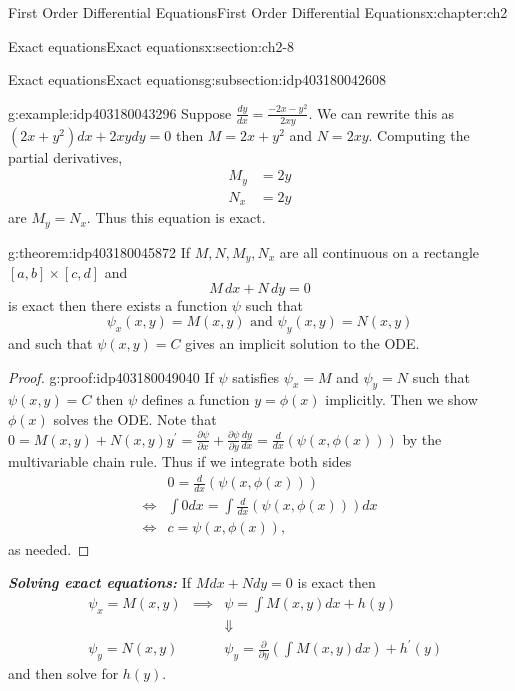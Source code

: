 \documentclass[oneside,10pt,]{book}
\newcommand{\alert}[1]{\textbf{\textit{#1}}}
\numberwithin{equation}{section}
\numberwithin{equation}{section}
\newcommand{\amp}{&}
\begin{document}
\begin{chapterptx}{First Order Differential Equations}{}{First Order Differential Equations}{}{}{x:chapter:ch2}
\begin{sectionptx}{Exact equations}{}{Exact equations}{}{}{x:section:ch2-8}
\begin{subsectionptx}{Exact equations}{}{Exact equations}{}{}{g:subsection:idp403180042608}
\begin{example}{}{g:example:idp403180043296}%
Suppose \(\frac{dy}{dx}=\frac{-2x-y^{2}}{2xy}.\) We can rewrite this as \(\left(2x+y^{2}\right)dx+2xydy=0\) then \(M=2x+y^{2}\) and \(N=2xy\). Computing the partial derivatives,%
\begin{align*}
M_{y} \amp =2y\\
N_{x} \amp =2y
\end{align*}
are \(M_{y}=N_{x}\). Thus this equation is exact.\end{example}
\begin{theorem}{}{}{g:theorem:idp403180045872}%
If \(M,N,M_{y},N_{x}\) are all continuous on a rectangle \([a,b]\times[c,d]\) and%
\begin{equation*}
M\,dx+N\,dy=0
\end{equation*}
is exact then there exists a function \(\psi\) such that%
\begin{equation*}
\psi_{x}(x,y)=M(x,y)\text{ and }\psi_{y}(x,y)=N(x,y)
\end{equation*}
and such that \(\psi(x,y)=C\) gives an implicit solution to the ODE.%
\end{theorem}
\begin{proof}{}{g:proof:idp403180049040}
If \(\psi\) satisfies \(\psi_{x}=M\) and \(\psi_{y}=N\) such that \(\psi(x,y)=C\) then \(\psi\) defines a function \(y=\phi(x)\) implicitly. Then we show \(\phi(x)\) solves the ODE. Note that \(0=M(x,y)+N(x,y)y^{\prime}=\frac{\partial\psi}{\partial x}+\frac{\partial\psi}{\partial y}\frac{dy}{dx}=\frac{d}{dx}\left(\psi\left(x,\phi(x)\right)\right)\) by the multivariable chain rule. Thus if we integrate both sides%
\begin{align*}
\amp 0 =\frac{d}{dx}\left(\psi\left(x,\phi(x)\right)\right) \\
\iff\amp \int0dx=\int\frac{d}{dx}\left(\psi\left(x,\phi(x)\right)\right)dx\\
\iff \amp c=\psi\left(x,\phi(x)\right),
\end{align*}
as needed.\end{proof}
\alert{Solving exact equations:} If \(Mdx+Ndy=0\) is exact then%
\begin{align*}
\amp \psi_{x}=M(x,y) \amp \implies \amp \psi=\int M(x,y)dx+h(y)\\
\amp \amp \amp \Downarrow\\
\amp \psi_{y}=N(x,y) \amp \amp \psi_{y}=\frac{\partial}{\partial y}\left(\int M(x,y)dx\right)+h^{\prime}(y)
\end{align*}
and then solve for \(h(y)\).%

\end{subsectionptx}
\end{sectionptx}
\end{chapterptx}
\end{document}
